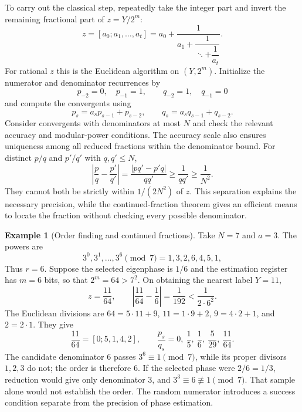 \documentclass[11pt,oneside,openany]{book}
\theoremstyle{definition}
\newtheorem{example}[proposition]{Example}
\begin{document}
To carry out the classical step, repeatedly take the integer part and invert the remaining fractional part of $z=Y/2^m$:
\begin{equation}
 z=[a_0;a_1,\ldots,a_t]
 =a_0+\frac1{a_1+\dfrac1{\ddots+\dfrac1{a_t}}}.
\end{equation}
For rational $z$ this is the Euclidean algorithm on $(Y,2^m)$. Initialize the numerator and denominator recurrences by
\begin{equation}
 p_{-2}=0,\quad p_{-1}=1,\qquad q_{-2}=1,\quad q_{-1}=0
\end{equation}
and compute the convergents using
\begin{equation}
 p_s=a_s p_{s-1}+p_{s-2},\qquad q_s=a_s q_{s-1}+q_{s-2}.
\end{equation}
Consider convergents with denominators at most $N$ and check the relevant accuracy and modular-power conditions. The accuracy scale also ensures uniqueness among all reduced fractions within the denominator bound. For distinct $p/q$ and $p'/q'$ with $q,q'\le N$,
\begin{equation}
 \left|\frac pq-\frac{p'}{q'}\right|
 =\frac{|pq'-p'q|}{qq'}\ge\frac1{qq'}\ge\frac1{N^2}.
\end{equation}
They cannot both be strictly within $1/(2N^2)$ of $z$. This separation explains the necessary precision, while the continued-fraction theorem gives an efficient means to locate the fraction without checking every possible denominator.

\begin{example}[Order finding and continued fractions]
Take $N=7$ and $a=3$. The powers are
\begin{equation}
 3^0,3^1,\ldots,3^6\pmod7=1,3,2,6,4,5,1,
\end{equation}
Thus $r=6$. Suppose the selected eigenphase is $1/6$ and the estimation register has $m=6$ bits, so that $2^m=64>7^2$. On obtaining the nearest label $Y=11$,
\begin{equation}
 z=\frac{11}{64},\qquad \left|\frac{11}{64}-\frac16\right|=\frac1{192}<\frac1{2\cdot6^2}.
\end{equation}
The Euclidean divisions are $64=5\cdot11+9$, $11=1\cdot9+2$, $9=4\cdot2+1$, and $2=2\cdot1$. They give
\begin{equation}
 \frac{11}{64}=[0;5,1,4,2],\qquad
 \frac{p_s}{q_s}=0,\ \frac15,\ \frac16,\ \frac5{29},\ \frac{11}{64}.
\end{equation}
The candidate denominator $6$ passes $3^6\equiv1\pmod7$, while its proper divisors $1,2,3$ do not; the order is therefore $6$. If the selected phase were $2/6=1/3$, reduction would give only denominator $3$, and $3^3\equiv6\not\equiv1\pmod7$. That sample alone would not establish the order. The random numerator introduces a success condition separate from the precision of phase estimation.
\end{example}
\end{document}

